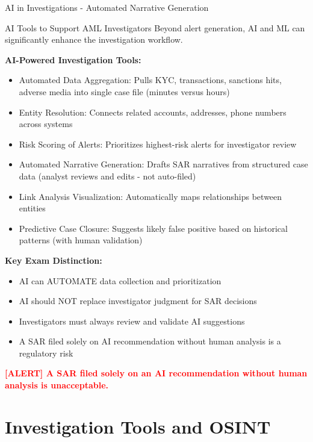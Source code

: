\documentclass[11pt,a4paper]{beamer}
\newcommand{\redflag}[1]{\textcolor{red}{\textbf{[ALERT] #1}}}
\begin{document}
	\begin{frame}{AI in Investigations - Automated Narrative Generation}
		\begin{block}{AI Tools to Support AML Investigators}
			Beyond alert generation, AI and ML can significantly enhance the investigation workflow.
		\end{block}
		
		\textbf{AI-Powered Investigation Tools:}
		\begin{itemize}
			\item Automated Data Aggregation: Pulls KYC, transactions, sanctions hits, adverse media into single case file (minutes versus hours)
			\item Entity Resolution: Connects related accounts, addresses, phone numbers across systems
			\item Risk Scoring of Alerts: Prioritizes highest-risk alerts for investigator review
			\item Automated Narrative Generation: Drafts SAR narratives from structured case data (analyst reviews and edits - not auto-filed)
			\item Link Analysis Visualization: Automatically maps relationships between entities
			\item Predictive Case Closure: Suggests likely false positive based on historical patterns (with human validation)
		\end{itemize}
		
		\textbf{Key Exam Distinction:}
		\begin{itemize}
			\item AI can AUTOMATE data collection and prioritization
			\item AI should NOT replace investigator judgment for SAR decisions
			\item Investigators must always review and validate AI suggestions
			\item A SAR filed solely on AI recommendation without human analysis is a regulatory risk
		\end{itemize}
		
		\redflag{A SAR filed solely on an AI recommendation without human analysis is unacceptable.}
	\end{frame}
	
	\section{Investigation Tools and OSINT}
	
\end{document}
